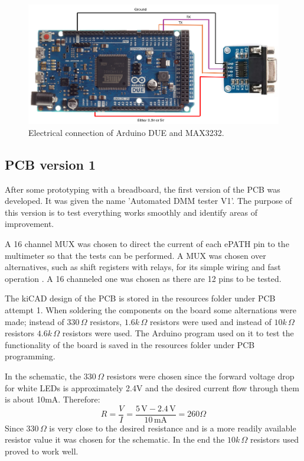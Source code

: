\begin{figure}[H]
          \centering
          \includegraphics[width=1\linewidth]{img/MAX3232_connection.png}
          \caption{Electrical connection of Arduino DUE and MAX3232.}
          \label{MAX3232_Arduino}
    \end{figure}


\subsection{PCB version 1}
After some prototyping with a breadboard, the first version of the PCB was developed. It was given the name 'Automated DMM tester V1'. The purpose of this version is to test everything works smoothly and identify areas of improvement. 

A 16 channel MUX was chosen to direct the current of each ePATH pin to the multimeter so that the tests can be performed. A MUX was chosen over alternatives, such as shift registers with relays, for its simple wiring and fast operation \cite{tiMAX3232guide}. A 16 channeled one was chosen as there are 12 pins to be tested.

The kiCAD design of the PCB is stored in the resources folder under PCB attempt 1. When soldering the components on the board some alternations were made; instead of $330\,\Omega$ resistors, $1.6k\,\Omega$ resistors were used and instead of $10k\,\Omega$ resistors $4.6k\,\Omega$ resistors were used. The Arduino program used on it to test the functionality of the board is saved in the resources folder under PCB programming. 

In the schematic, the $330\,\Omega$ resistors were chosen since the forward voltage drop for white LEDs is approximately 2.4V and the desired current flow through them is about 10mA. Therefore:
\[
R = \frac{V}{I} = \frac{5\,\mathrm{V} - 2.4\,\mathrm{V}}{10\,\mathrm{mA}}=260\Omega
\]
Since $330\,\Omega$ is very close to the desired resistance and is a more readily available resistor value it was chosen for the schematic. In the end the $10k\,\Omega$ resistors used proved to work well.


